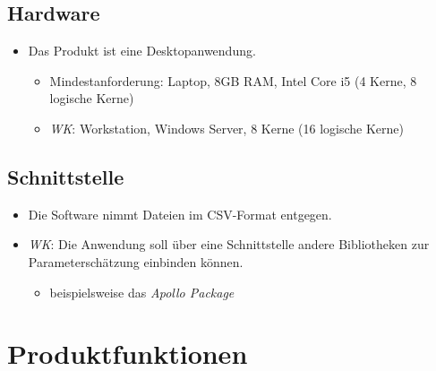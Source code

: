 \documentclass{article}
\begin{document}
\subsection{Hardware}
\begin{itemize}
    \item Das Produkt ist eine Desktopanwendung.
    \begin{itemize}
        \item Mindestanforderung: Laptop, 8GB RAM, Intel Core i5 (4 Kerne, 8 logische Kerne)
        \item \textit{WK}: Workstation, Windows Server, 8 Kerne (16 logische Kerne)
    \end{itemize}
\end{itemize}
\subsection{Schnittstelle}
\begin{itemize}
    \item Die Software nimmt Dateien im CSV-Format entgegen.
    \item \textit{WK}: Die Anwendung soll über eine Schnittstelle andere Bibliotheken zur Parameterschätzung einbinden können.
    \begin{itemize}
        \item beispielsweise das \textit{Apollo Package}
    \end{itemize}
\end{itemize}
\newpage

\section{Produktfunktionen}
\end{document}
